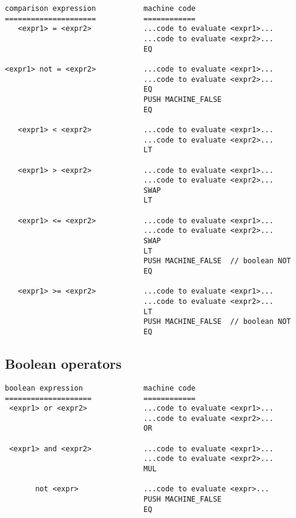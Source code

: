 \documentclass[11pt]{article}
\begin{document}
\begin{verbatim}
comparison expression           machine code
=====================           ============
   <expr1> = <expr2>            ...code to evaluate <expr1>...
                                ...code to evaluate <expr2>...
                                EQ
                                
<expr1> not = <expr2>           ...code to evaluate <expr1>...
                                ...code to evaluate <expr2>...
                                EQ
                                PUSH MACHINE_FALSE
                                EQ
                                
   <expr1> < <expr2>            ...code to evaluate <expr1>...
                                ...code to evaluate <expr2>...
                                LT
                                
   <expr1> > <expr2>            ...code to evaluate <expr1>...
                                ...code to evaluate <expr2>...
                                SWAP
                                LT
                                
   <expr1> <= <expr2>           ...code to evaluate <expr1>...
                                ...code to evaluate <expr2>...
                                SWAP
                                LT
                                PUSH MACHINE_FALSE  // boolean NOT
                                EQ
                                
   <expr1> >= <expr2>           ...code to evaluate <expr1>...
                                ...code to evaluate <expr2>...
                                LT
                                PUSH MACHINE_FALSE  // boolean NOT
                                EQ
\end{verbatim}

\subsection{Boolean operators}

\begin{verbatim}
boolean expression              machine code
====================            ============
 <expr1> or <expr2>             ...code to evaluate <expr1>...
                                ...code to evaluate <expr2>...
                                OR
                                  
 <expr1> and <expr2>            ...code to evaluate <expr1>...
                                ...code to evaluate <expr2>...
                                MUL
                                  
       not <expr>               ...code to evaluate <expr>...
                                PUSH MACHINE_FALSE
                                EQ
\end{verbatim}
\end{document}
